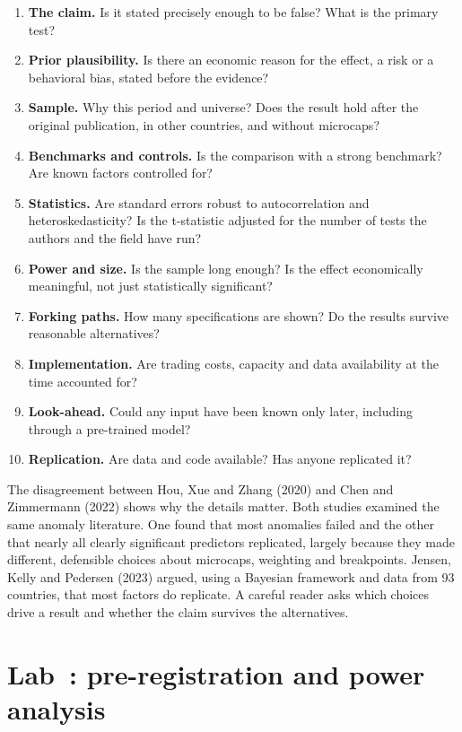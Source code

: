 \begin{enumerate}
  \item \textbf{The claim.} Is it stated precisely enough to be false? What is the primary test?
  \item \textbf{Prior plausibility.} Is there an economic reason for the effect, a risk or a behavioral bias, stated before the evidence?
  \item \textbf{Sample.} Why this period and universe? Does the result hold after the original publication, in other countries, and without microcaps?
  \item \textbf{Benchmarks and controls.} Is the comparison with a strong benchmark? Are known factors controlled for?
  \item \textbf{Statistics.} Are standard errors robust to autocorrelation and heteroskedasticity? Is the t-statistic adjusted for the number of tests the authors and the field have run?
  \item \textbf{Power and size.} Is the sample long enough? Is the effect economically meaningful, not just statistically significant?
  \item \textbf{Forking paths.} How many specifications are shown? Do the results survive reasonable alternatives?
  \item \textbf{Implementation.} Are trading costs, capacity and data availability at the time accounted for?
  \item \textbf{Look-ahead.} Could any input have been known only later, including through a pre-trained model?
  \item \textbf{Replication.} Are data and code available? Has anyone replicated it?
\end{enumerate}

The disagreement between Hou, Xue and Zhang (2020) and Chen and Zimmermann (2022) shows why the details matter. Both studies examined the same anomaly literature. One found that most anomalies failed and the other that nearly all clearly significant predictors replicated, largely because they made different, defensible choices about microcaps, weighting and breakpoints. Jensen, Kelly and Pedersen (2023) argued, using a Bayesian framework and data from 93 countries, that most factors do replicate. A careful reader asks which choices drive a result and whether the claim survives the alternatives.

\section{Lab~\thechapter: pre-registration and power analysis}
\label{sec:25-lab}

